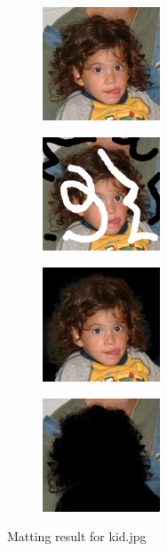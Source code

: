 \documentclass[11pt,letterpaper]{article}
\begin{document}
\begin{figure}[h]
  \centering
  \begin{subfigure}{0.24\textwidth}
    \centering
    \includegraphics[width=3.5cm]{./result/kid/kid.jpg}
    \caption{}
  \end{subfigure}
  \begin{subfigure}{0.24\textwidth}
    \centering
    \includegraphics[width=3.5cm]{./result/kid/kid_m.jpg}
    \caption{}
  \end{subfigure}
  \begin{subfigure}{0.24\textwidth}
    \centering
    \includegraphics[width=3.5cm]{./result/kid/kid_foreground.jpg}
    \caption{}
  \end{subfigure}
  \begin{subfigure}{0.24\textwidth}
    \centering
    \includegraphics[width=3.5cm]{./result/kid/kid_background.jpg}
    \caption{}
  \end{subfigure}    
  \caption {Matting result for kid.jpg}
\end{figure}
\end{document}
